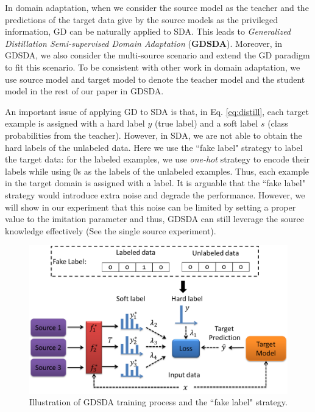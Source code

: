 In domain adaptation, when we consider the source model as the teacher and the predictions of the target data give by the source models as the privileged information,
GD can be naturally applied to SDA. This leads to \textit{Generalized Distillation Semi-supervised Domain Adaptation} (\textbf{GDSDA}). Moreover, in GDSDA, we also consider the multi-source scenario and extend the GD paradigm to fit this scenario. To be consistent with other work in domain adaptation, we use source model and target model to denote the teacher model and the student model in the rest of our paper in GDSDA.

An important issue of applying GD to SDA is that, in Eq. \eqref{eq:distill}, each target example is assigned with a hard label $y$ (true label) and a soft label $s$ (class probabilities from the teacher). However, in SDA, we are not able to obtain the hard labels of the unlabeled data. Here we use the ``fake label" strategy to label the target data: for the labeled examples, we use \textit{one-hot} strategy to encode their labels while using 0s as the labels of the unlabeled examples. Thus, each example in the target domain is assigned with a label. It is arguable that the ``fake label" strategy would introduce extra noise and degrade the performance. However, we will show in our experiment that this noise can be limited by setting a proper value to the imitation parameter and thus, GDSDA can still leverage the source knowledge effectively (See the single source experiment).
\begin{figure}
	\centering
	\includegraphics[scale=.4]{figure/multi-GDDA.png}
	\caption{Illustration of GDSDA training process and the ``fake label" strategy.}
	\label{fig:GDSDA}
\end{figure}
 
